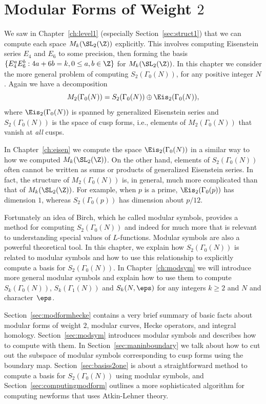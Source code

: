 \chapter{Modular Forms of Weight $2$}\label{ch:modform2}

We saw in Chapter~\ref{ch:level1} (especially
Section~\ref{sec:struct1}) that we can compute each space
$M_k(\SL_2(\Z))$ explicitly.  This involves computing Eisenstein
series $E_4$ and $E_6$ to some precision, then forming the basis
$\{E_4^a E_6^b : 4a+6b = k, 0\leq a,b \in \Z\}$ for $M_k(\SL_2(\Z))$.
In this chapter we consider the more general problem of computing
$S_2(\Gamma_0(N))$, for any positive integer $N$.  Again we have a
decomposition
$$
   M_2(\Gamma_0(N)) = S_2(\Gamma_0(N)) \oplus \Eis_2(\Gamma_0(N)),
$$
where $\Eis_2(\Gamma_0(N))$ is spanned by generalized
Eisenstein
 series and $S_2(\Gamma_0(N))$ is the space of cusp forms,
i.e., elements of $M_2(\Gamma_0(N))$ that vanish at {\em all} cusps.

In Chapter~\ref{ch:eisen} we compute the space $\Eis_2(\Gamma_0(N))$
in a similar way to how we computed $M_k(\SL_2(\Z))$.  On the other
hand, elements of $S_2(\Gamma_0(N))$ often cannot be written as sums
or products of generalized Eisenstein series.  In fact, the structure
of $M_2(\Gamma_0(N))$ is, in general, much more complicated than that
of $M_k(\SL_2(\Z))$.  For example, when $p$ is a prime,
$\Eis_2(\Gamma_0(p))$ has dimension $1$, whereas $S_2(\Gamma_0(p))$
has dimension about $p/12$.

Fortunately an idea of Birch, which he called modular symbols, provides a
method for computing $S_2(\Gamma_0(N))$ and indeed for much more
that is relevant to understanding special values of $L$-functions.
Modular symbols are also a powerful theoretical tool.  In this
chapter, we explain how $S_2(\Gamma_0(N))$ is related to modular
symbols and how to use this relationship to explicitly compute a
basis for $S_2(\Gamma_0(N))$. In Chapter~\ref{ch:modsym} we will
introduce more general modular symbols and explain how to use them to
compute $S_k(\Gamma_0(N))$, $S_k(\Gamma_1(N))$ and $S_k(N,\eps)$ for
any integers $k\geq 2$ and $N$ and character~$\eps$.

Section~\ref{sec:modformhecke} contains a very brief summary of basic facts
about modular forms of weight $2$, modular curves, Hecke operators,
and integral homology.  Section~\ref{sec:modsym} introduces modular
symbols and describes how to compute with them.  In
Section~\ref{sec:maninboundary} we talk about how to cut out the
subspace of modular symbols corresponding to cusp forms using the
boundary map.  Section~\ref{sec:basiss2one} is about a straightforward
method to compute a basis for $S_2(\Gamma_0(N))$ using modular
symbols, and Section~\ref{sec:computingmodform} outlines a more
sophisticated algorithm for computing newforms that uses
Atkin-Lehner theory.

